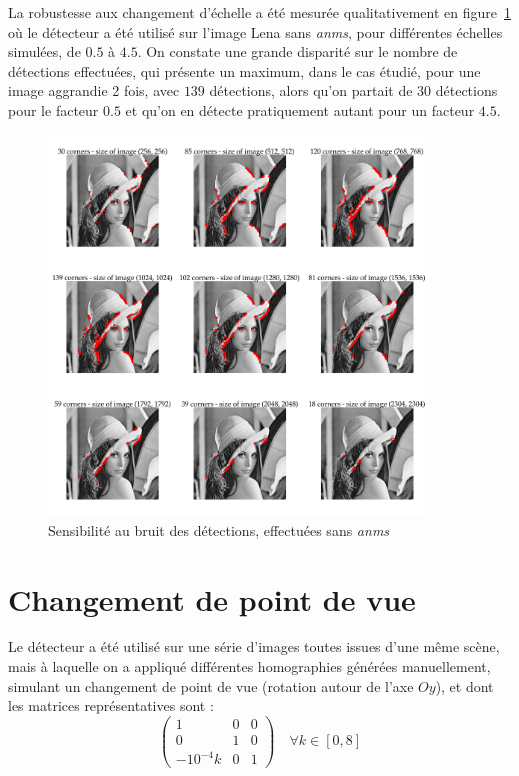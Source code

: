 \documentclass[12pt,a4paper,onecolumn]{article}
\begin{document}
La robustesse aux changement d'échelle a été mesurée qualitativement en figure~\ref{fig_3_rescale} où le détecteur a été utilisé sur l'image Lena sans \textit{anms}, pour différentes échelles simulées, de \(0.5\) à \(4.5\). On constate une grande disparité sur le nombre de détections effectuées, qui présente un maximum, dans le cas étudié, pour une image aggrandie 2 fois, avec \(139\) détections, alors qu'on partait de 30 détections pour le facteur \(0.5\) et qu'on en détecte pratiquement autant pour un facteur \(4.5\).


\begin{figure}[H]
	\centering
	\includegraphics[width = 0.9\textwidth]{3_lena_rescale_raw}
	\caption{Sensibilité au bruit des détections, effectuées sans \textit{anms}}
	\label{fig_3_rescale}
\end{figure}


\section{Changement de point de vue}

Le détecteur a été utilisé sur une série d'images toutes issues d'une même scène, mais à laquelle on a appliqué différentes homographies générées manuellement, simulant un changement de point de vue (rotation autour de l'axe \(Oy\)), et dont les matrices représentatives sont :
\begin{equation}
	\begin{pmatrix}
		1          & 0 & 0 \\
		0          & 1 & 0 \\
		-10^{-4} k & 0 & 1
	\end{pmatrix}
	\quad \forall k \in [0, 8]
	\label{eq_view}
\end{equation}
\end{document}
